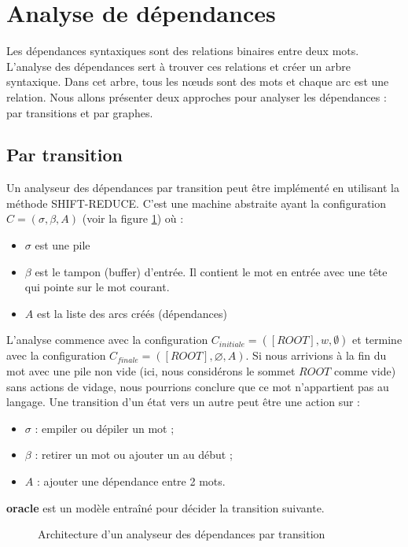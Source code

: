 \documentclass{KodeBook}
\begin{document}
\section{Analyse de dépendances}

Les dépendances syntaxiques sont des relations binaires entre deux mots. 
L'analyse des dépendances sert à trouver ces relations et créer un arbre syntaxique. 
Dans cet arbre, tous les nœuds sont des mots et chaque arc est une relation.
Nous allons présenter deux approches pour analyser les dépendances : par transitions et par graphes.

\subsection{Par transition}

Un analyseur des dépendances par transition peut être implémenté en utilisant la méthode SHIFT-REDUCE. 
C'est une machine abstraite ayant la configuration $C = (\sigma, \beta, A)$ (voir la figure \ref{fig:dep-trans-arch}) où :
\begin{itemize}
	\item $\sigma$ est une pile
	\item $\beta$ est le tampon (buffer) d'entrée. 
	Il contient le mot en entrée avec une tête qui pointe sur le mot courant.
	\item $A$ est la liste des arcs créés (dépendances)
\end{itemize}
L'analyse commence avec la configuration $C_{initiale} = ([ROOT], w, \emptyset)$ et termine avec la configuration $C_{finale} = ([ROOT], \varnothing, A)$.
Si nous arrivions à la fin du mot avec une pile non vide (ici, nous considérons le sommet $ROOT$ comme vide) sans actions de vidage, nous pourrions conclure que ce mot n'appartient pas au langage. 
Une transition d'un état vers un autre peut être une action sur :
\begin{itemize}
	\item $\sigma$ : empiler ou dépiler un mot ;
	\item $\beta$ : retirer un mot ou ajouter un au début ;
	\item $A$ : ajouter une dépendance entre 2 mots.
\end{itemize}
\textbf{oracle} est un modèle entraîné pour décider la transition suivante.

\begin{figure}[ht]
	\centering
	\caption{Architecture d'un analyseur des dépendances par transition \label{fig:dep-trans-arch}}
\end{figure}
\end{document}
